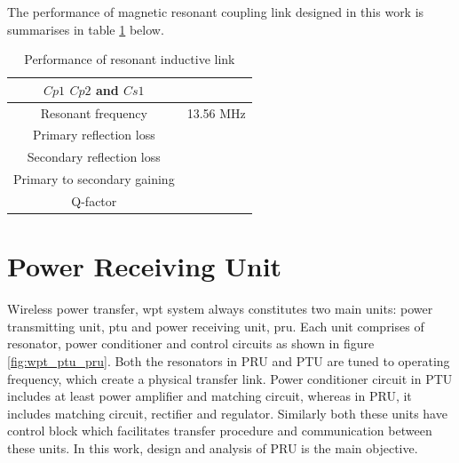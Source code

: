 \documentclass[12pt,a4paper,UKenglish]{article}
\begin{document}
The performance of magnetic resonant coupling link designed in this work is summarises in table \ref{tab:ant_spec} below.

\begin{table}[!htbp]
\caption{Performance of resonant inductive link} 
\begin{center}
\begin{tabular}{c|c}
\hline \hline
$Cp1$ $Cp2$ and $Cs1$	  	& 			\\ \hline
Resonant frequency		& 13.56 MHz		\\ \hline
Primary reflection loss		&			\\ \hline
Secondary reflection loss	& 			\\ \hline
Primary to secondary gaining	& 			\\ \hline
Q-factor			&			\\
\hline \hline
\end{tabular}
\end{center}
\label{tab:ant_spec}
\end{table}%

\clearpage
\newpage


\section{Power Receiving Unit}
Wireless power transfer, \acrshort{wpt} system always constitutes two main units: power transmitting unit, 
\acrshort{ptu} and power receiving unit, \acrshort{pru}. Each unit comprises of resonator, power conditioner 
and control circuits as shown in figure \ref{fig:wpt_ptu_pru}. Both the resonators in PRU and PTU are tuned to operating 
frequency, which create a physical transfer link. Power conditioner circuit in PTU includes at least power 
amplifier and matching circuit, whereas in PRU, it includes matching circuit, rectifier and regulator. 
Similarly both these units have control block which facilitates transfer procedure and communication between 
these units.  In this work, design and analysis of PRU is the main objective.  \\
\end{document}
